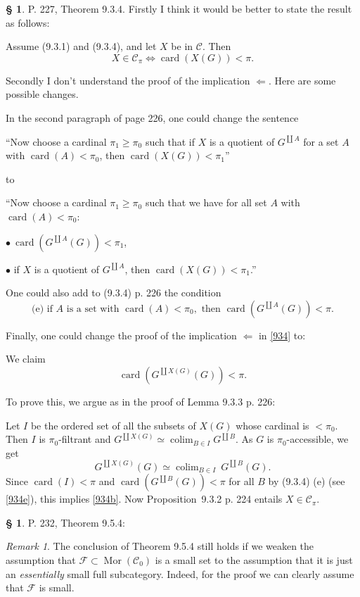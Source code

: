 \documentclass[12pt]{article}
\theoremstyle{remark}
\newtheorem{rk}[thm]{Remark}
\theoremstyle{definition}
\newtheorem{s}[thm]{\S}
\newcommand{\bu}{\bullet}
\newcommand{\cc}{\mathcal}
\newcommand{\C}{\mathcal C}
\newcommand{\si}{\Leftarrow}
\newcommand{\ssi}{\Leftrightarrow}%
\DeclareMathOperator*{\co}{colim}
\DeclareMathOperator{\card}{card}%
\DeclareMathOperator{\Mor}{Mor}
\begin{document}
\begin{s} 
P. 227, Theorem 9.3.4. Firstly I think it would be better to state the result as follows:

Assume (9.3.1) and (9.3.4), and let $X$ be in $\C$. Then 
\begin{equation}\label{934}
X\in\C_\pi\ssi\card(X(G))<\pi.
\end{equation} 

Secondly I don't understand the proof of the implication $\si$. Here are some possible changes. 

In the second paragraph of page 226, one could change the sentence 

``Now choose a cardinal $\pi_1\ge\pi_0$ such that if $X$ is a quotient of $G^{\coprod A}$ for a set $A$ with $\card(A)<\pi_0$, then $\card(X(G))<\pi_1$''

\noindent to 

``Now choose a cardinal $\pi_1\ge\pi_0$ such that we have for all set $A$ with $\card(A)<\pi_0$: 

$\bu\ \card(G^{\coprod A}(G))<\pi_1$, 

$\bu$ if $X$ is a quotient of $G^{\coprod A}$, then $\card(X(G))<\pi_1$.'' 

One could also add to (9.3.4) p. 226 the condition 
\begin{equation}\label{934e}
\text{(e) if }A\text{ is a set with }\card(A)<\pi_0,\text{ then }\card(G^{\coprod A}(G))<\pi.
\end{equation}

Finally, one could change the proof of the implication $\si$ in \eqref{934} to: 

We claim
\begin{equation}\label{934b}
\card(G^{\coprod X(G)}(G))<\pi.
\end{equation} 

To prove this, we argue as in the proof of Lemma 9.3.3 p. 226: 

Let $I$ be the ordered set of all the subsets of $X(G)$ whose cardinal is $<\pi_0$. Then $I$ is $\pi_0$-filtrant and $G^{\coprod X(G)}\simeq\co_{B\in I}G^{\coprod B}$. As $G$ is $\pi_0$-accessible, we get 
$$
G^{\coprod X(G)}(G)\simeq\co_{B\in I}\ G^{\coprod B}(G).
$$ 
Since $\card(I)<\pi$ and $\card(G^{\coprod B}(G))<\pi$ for all $B$ by (9.3.4) (e) (see \eqref{934e}), this implies \eqref{934b}. Now Proposition~9.3.2 p. 224 entails $X\in\C_\pi$.
\end{s}
%
%
\begin{s} 
P. 232, Theorem 9.5.4: 
\begin{rk}\label{954}
The conclusion of Theorem 9.5.4 still holds if we weaken the assumption that $\cc F\subset\Mor(\C_0)$ is a small set to the assumption that it is just an {\em essentially} small full subcategory. Indeed, for the proof we can clearly assume that $\cc F$ is small. 
\end{rk}
\end{s}
\end{document}
